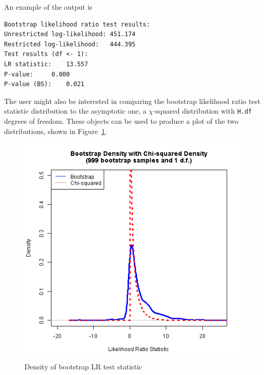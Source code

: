 \documentclass[article]{jss}
\begin{document}

%

An example of the output is
\begin{verbatim}
Bootstrap likelihood ratio test results:
Unrestricted log-likelihood: 451.174
Restricted log-likelihood:   444.395
Test results (df <- 1):
LR statistic: 	 13.557
P-value: 	 0.000
P-value (BS): 	 0.021
\end{verbatim}

The user might also be interested in comparing the bootstrap likelihood ratio test statistic distribution to the asymptotic one, a $\chi$-squared distribution with \verb|H.df| degrees of freedom. 
These objects can be used to produce 
a plot of the two distributions, shown in Figure~\ref{fig:BS}.

\begin{figure}[tbh]
  \centering
  \includegraphics[scale = 1, keepaspectratio=true]{Figures/LRdensity_bw045.png}
  \caption{Density of bootstrap LR test statistic}
  \label{fig:BS}
\end{figure}
\end{document}
